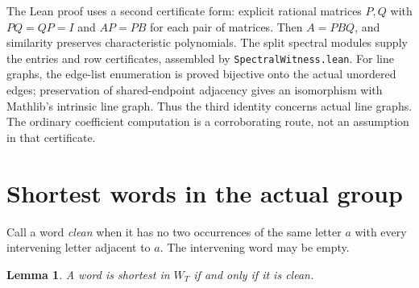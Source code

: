 \documentclass[11pt]{article}
\newtheorem{lemma}{Lemma}
\begin{document}
The Lean proof uses a second certificate form: explicit rational matrices \(P,Q\) with \(PQ=QP=I\) and \(AP=PB\) for each pair of matrices. Then \(A=PBQ\), and similarity preserves characteristic polynomials. The split spectral modules supply the entries and row certificates, assembled by \texttt{SpectralWitness.lean}. For line graphs, the edge-list enumeration is proved bijective onto the actual unordered edges; preservation of shared-endpoint adjacency gives an isomorphism with Mathlib's intrinsic line graph. Thus the third identity concerns actual line graphs. The ordinary coefficient computation is a corroborating route, not an assumption in that certificate.
\newpage
\section{Shortest words in the actual group}
Call a word \emph{clean} when it has no two occurrences of the same letter \(a\) with every intervening letter adjacent to \(a\). The intervening word may be empty.
\begin{lemma}\label{normal}
A word is shortest in \(W_T\) if and only if it is clean.
\end{lemma}
\end{document}
